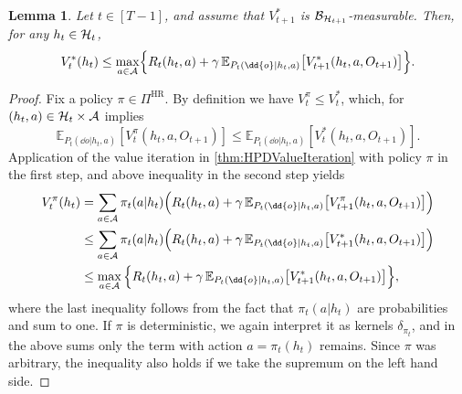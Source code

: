 \documentclass[
    a4paper,
    11pt,
    bibliography=totoc,
    listof=totoc,      
    headinclude=true,
    cleardoublepage=empty,
]{scrbook}
\theoremstyle{plain}
\newtheorem{lemma}[theorem]{Lemma}
\theoremstyle{definition}
\theoremstyle{remark}
\newcommand{\E}{\mathbb E}
\newcommand{\SpaceA}{{\cal A}}
\newcommand{\SpaceH}{{\cal H}}
\begin{document}
%
\begin{lemma}
\label{lem:HDPOptimalValueIterationAuxiliary}
    Let $t\in[T-1]$, and assume that $V^*_{t+1}$ is 
    $\mathcal{B}_{\SpaceH_{t+1}}$-measurable. Then, for any $h_t\in\SpaceH_t$,
    \begin{equation}
        V_t^*(h_t) \leq 
        \max_{a\in\SpaceA} \Bigl\{
            R_t(h_t,a) + \gamma \,
            \E_{P_t(\dd{o}|h_t,a)} \bigl[ V^*_{t+1}(h_t, a, O_{t+1}) \bigr]
        \Bigr\}.
    \end{equation}
\end{lemma}
\begin{proof}
    Fix a policy $\pi\in\Pi^\text{HR}$. By definition we have $V^\pi_t\leq
    V^*_t$, which, for $(h_t,a)\in\SpaceH_t\times\SpaceA$ implies 
    \[
        \E_{P_t(\dd{o}|h_t,a)}[V^\pi_t(h_t,a,O_{t+1})]
        \leq
        \E_{P_t(\dd{o}|h_t,a)}[V^*_t(h_t,a,O_{t+1})].        
    \]
    Application of the value iteration in \cref{thm:HPDValueIteration}
    with policy $\pi$ in the first step, and above inequality in the second 
    step yields
    \begin{align*}
        V^\pi_t(h_t) 
        &= \sum_{a\in\SpaceA} \pi_t(a|h_t) \Bigl(
            R_t(h_t, a) + \gamma \,
                \E_{P_{t}(\dd{o}|h_t, a)} \bigl[ 
                    V^\pi_{t+1} (h_t, a, O_{t+1})
                \bigr]
            \Bigr) \\
        &\leq \sum_{a\in\SpaceA} \pi_t(a|h_t) \Bigl(
            R_t(h_t, a) + \gamma \,
                \E_{P_{t}(\dd{o}|h_t, a)} \bigl[ 
                    V^*_{t+1} (h_t, a, O_{t+1})
                \bigr]
            \Bigr) \\   
        &\leq \max_{a\in\SpaceA}\, \Bigl\{
            R_t(h_t, a) + \gamma \,
                \E_{P_{t}(\dd{o}|h_t, a)} \bigl[ 
                    V^*_{t+1} (h_t, a, O_{t+1})
                \bigr]
            \Bigr\},      
        \end{align*}
    where the last inequality follows from the fact that $\pi_t(a|h_t)$ are 
    probabilities and sum to one. If $\pi$ is deterministic, we again 
    interpret it as kernels $\delta_{\pi_t}$, and in the above sums only the 
    term with action $a=\pi_t(h_t)$ remains. Since $\pi$ was arbitrary, the 
    inequality also holds if we take the supremum on the left hand side.
\end{proof}
\end{document}
